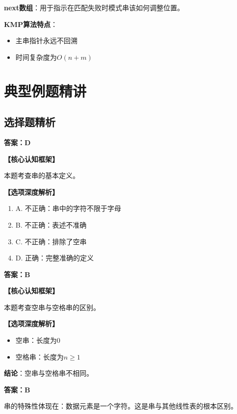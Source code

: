\documentclass[12pt, a4paper]{article}
\begin{document}
\textbf{next数组}：用于指示在匹配失败时模式串该如何调整位置。

\textbf{KMP算法特点}：
\begin{itemize}
	\item 主串指针永远不回溯
	\item 时间复杂度为$O(n + m)$
\end{itemize}

\section{典型例题精讲}

\subsection{选择题精析}

\begin{framed}
	\textbf{答案：D}

	\textbf{【核心认知框架】}

	本题考查串的基本定义。

	\textbf{【选项深度解析】}

	\begin{enumerate}
		\item A. 不正确：串中的字符不限于字母
		\item B. 不正确：表述不准确
		\item C. 不正确：排除了空串
		\item D. 正确：完整准确的定义
	\end{enumerate}
\end{framed}

\begin{framed}
	\textbf{答案：B}

	\textbf{【核心认知框架】}

	本题考查空串与空格串的区别。

	\textbf{【选项深度解析】}

	\begin{itemize}
		\item 空串：长度为0
		\item 空格串：长度为$n \ge 1$
	\end{itemize}

	\textbf{结论}：空串与空格串不相同。
\end{framed}

\begin{framed}
	\textbf{答案：B}

	串的特殊性体现在：数据元素是一个字符。这是串与其他线性表的根本区别。
\end{framed}
\end{document}
